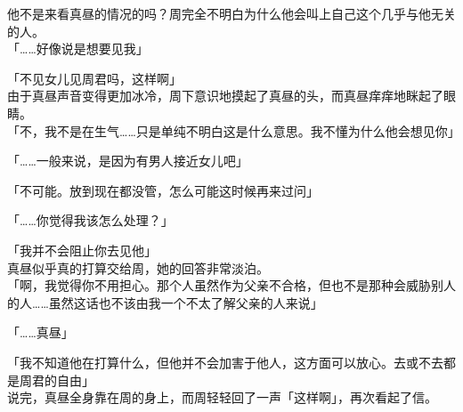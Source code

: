 他不是来看真昼的情况的吗？周完全不明白为什么他会叫上自己这个几乎与他无关的人。\\

「……好像说是想要见我」

「不见女儿见周君吗，这样啊」\\

由于真昼声音变得更加冰冷，周下意识地摸起了真昼的头，而真昼痒痒地眯起了眼睛。\\

「不，我不是在生气……只是单纯不明白这是什么意思。我不懂为什么他会想见你」

「……一般来说，是因为有男人接近女儿吧」

「不可能。放到现在都没管，怎么可能这时候再来过问」

「……你觉得我该怎么处理？」

「我并不会阻止你去见他」\\

真昼似乎真的打算交给周，她的回答非常淡泊。\\

「啊，我觉得你不用担心。那个人虽然作为父亲不合格，但也不是那种会威胁别人的人……虽然这话也不该由我一个不太了解父亲的人来说」

「……真昼」

「我不知道他在打算什么，但他并不会加害于他人，这方面可以放心。去或不去都是周君的自由」\\

说完，真昼全身靠在周的身上，而周轻轻回了一声「这样啊」，再次看起了信。
